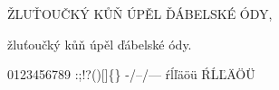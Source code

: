 ŽLUŤOUČKÝ KŮŇ ÚPĚL ĎÁBELSKÉ ÓDY,

žluťoučký kůň úpěl ďábelské ódy.

0123456789 :;!?()[]\{\} -/--/--- ŕĺľäöü ŔĹĽÄÖÜ

